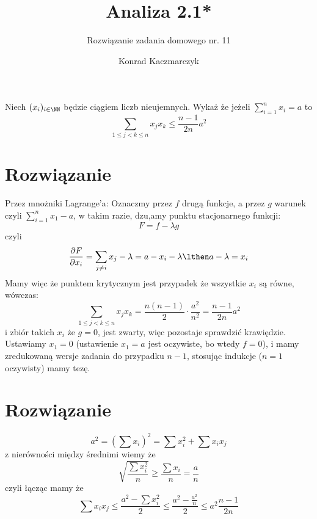 \documentclass[11pt]{scrartcl}
\author{Konrad Kaczmarczyk}
\begin{document}
  \title{Analiza 2.1*}
  \subtitle{Rozwiązanie zadania domowego nr. 11}
  \maketitle
    \begin{zadanie*}
      Niech $(x_i)_{i \in \NN}$ będzie ciągiem liczb nieujemnych. Wykaż że jeżeli $\sum_{i = 1}^{n} x_i = a $ to 
      \[
        \sum_{1 \leq j < k \leq n} x_j x_k \leq \frac{n - 1}{2n} a^2
      \]
      
    \end{zadanie*}
    
    \section{Rozwiązanie}
      Przez mnożniki Lagrange'a:
      Oznaczmy przez $f$ drugą funkcje, a przez $g$ warunek czyli $\sum_{i = 1}^{n} x_1 - a $, w takim razie, dzu,amy punktu stacjonarnego funkcji:
      \[
          F = f - \lambda g
      \]
      czyli
      \[
          \frac{\partial F}{\partial x_i} = \sum_{j \not = i} x_j - \lambda = a - x_i - \lambda \lthen a - \lambda = x_i   
      \]
      Mamy więc że punktem krytycznym jest przypadek że wszystkie $x_i$ są równe, wówczas:
      \[
        \sum_{1 \leq j < k \leq n} x_j x_k = \frac{n(n - 1)}{2} \cdot \frac{a^2}{n^2} = \frac{n - 1}{2n} a^2
      \]
      i zbiór takich $x_i$ że $g = 0$, jest zwarty, więc pozostaje sprawdzić krawiędzie. Ustawiamy $x_1 = 0$ (ustawienie $x_1 = a$ jest oczywiste, bo wtedy $f = 0$), i mamy zredukowaną wersje zadania do przypadku $n - 1$, stosując indukcje ($n = 1$ oczywisty) mamy tezę.

      \section{Rozwiązanie}
      \[
          a^2 = \left ( \sum x_i \right )^2 = \sum x^2_i + \sum x_i x_j
      \]
      z nierówności między średnimi wiemy że
      \[
          \sqrt{\frac{\sum x^2_i}{n}} \geq \frac{\sum x_i}{n} = \frac{a}{n} 
      \]
      czyli łącząc mamy że
      \[
          \sum x_i x_j \leq \frac{a^2 - \sum x^2_i}{2} \leq \frac{a^2 - \frac{a^2}{n}}{2} \leq a^2 \frac{n - 1}{2n}
      \]
      
      
          
      
    
    
\end{document}
